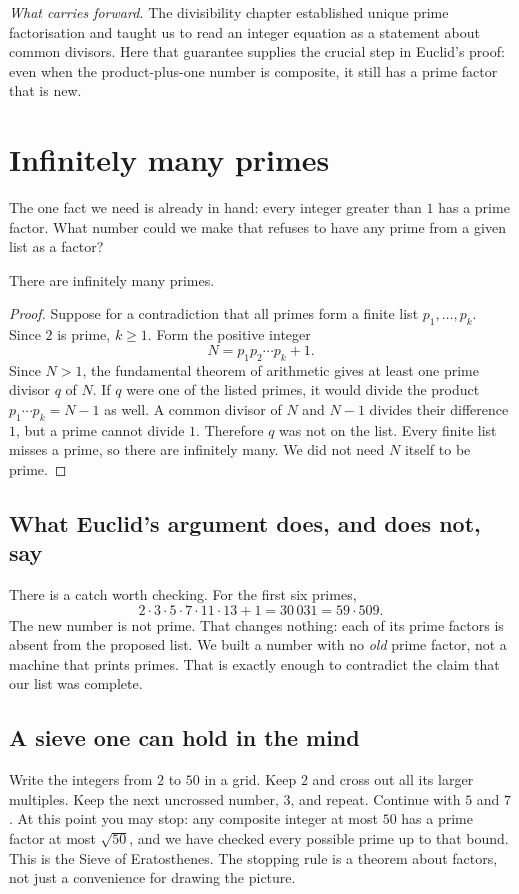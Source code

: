 
\noindent\emph{What carries forward.} The divisibility chapter established unique prime factorisation and taught us to read an integer equation as a statement about common divisors. Here that guarantee supplies the crucial step in Euclid's proof: even when the product-plus-one number is composite, it still has a prime factor that is new.

\section{Infinitely many primes}

The one fact we need is already in hand: every integer greater than $1$ has a prime factor. What number could we make that refuses to have any prime from a given list as a factor?

\begin{theorem}[Euclid]\label{thm:euclid-primes}
There are infinitely many primes.
\end{theorem}
\begin{proof}
Suppose for a contradiction that all primes form a finite list
$p_1,\ldots,p_k$. Since $2$ is prime, $k\ge1$.
Form the positive integer
\[
N=p_1p_2\cdots p_k+1.
\]
Since $N>1$, the fundamental theorem of arithmetic
gives at least one prime divisor $q$ of $N$.
If $q$ were one of the listed primes, it would
divide the product $p_1\cdots p_k=N-1$ as well.
A common divisor of $N$ and $N-1$ divides their
difference $1$, but a prime cannot divide $1$.
Therefore $q$ was not on the list. Every finite
list misses a prime, so there are infinitely many.
We did not need $N$ itself to be prime.
\end{proof}

\subsection*{What Euclid's argument does, and does not, say}
There is a catch worth checking. For the first six primes,
\[
2\cdot3\cdot5\cdot7\cdot11\cdot13+1=30\,031=59\cdot509.
\]
The new number is not prime. That changes nothing: each of its prime factors is absent from the proposed list. We built a number with no \emph{old} prime factor, not a machine that prints primes. That is exactly enough to contradict the claim that our list was complete.

\subsection*{A sieve one can hold in the mind}
Write the integers from $2$ to $50$ in a grid. Keep $2$ and cross out all its larger multiples. Keep the next uncrossed number, $3$, and repeat. Continue with $5$ and $7$. At this point you may stop: any composite integer at most $50$ has a prime factor at most $\sqrt{50}$, and we have checked every possible prime up to that bound. This is the Sieve of Eratosthenes. The stopping rule is a theorem about factors, not just a convenience for drawing the picture.

